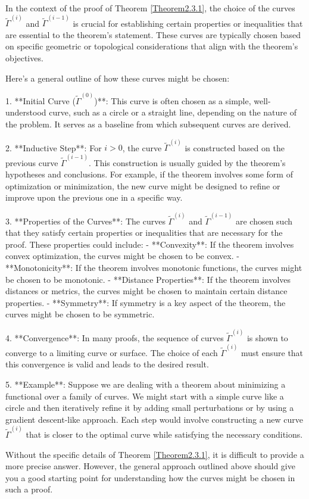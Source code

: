 In the context of the proof of Theorem \ref{Theorem2.3.1}, the choice of the curves \(\tilde{\Gamma}^{(i)}\) and \(\tilde{\Gamma}^{(i-1)}\) is crucial for establishing certain properties or inequalities that are essential to the theorem's statement. These curves are typically chosen based on specific geometric or topological considerations that align with the theorem's objectives.

Here’s a general outline of how these curves might be chosen:

1. **Initial Curve (\(\tilde{\Gamma}^{(0)}\))**: This curve is often chosen as a simple, well-understood curve, such as a circle or a straight line, depending on the nature of the problem. It serves as a baseline from which subsequent curves are derived.

2. **Inductive Step**: For \(i > 0\), the curve \(\tilde{\Gamma}^{(i)}\) is constructed based on the previous curve \(\tilde{\Gamma}^{(i-1)}\). This construction is usually guided by the theorem's hypotheses and conclusions. For example, if the theorem involves some form of optimization or minimization, the new curve might be designed to refine or improve upon the previous one in a specific way.

3. **Properties of the Curves**: The curves \(\tilde{\Gamma}^{(i)}\) and \(\tilde{\Gamma}^{(i-1)}\) are chosen such that they satisfy certain properties or inequalities that are necessary for the proof. These properties could include:
   - **Convexity**: If the theorem involves convex optimization, the curves might be chosen to be convex.
   - **Monotonicity**: If the theorem involves monotonic functions, the curves might be chosen to be monotonic.
   - **Distance Properties**: If the theorem involves distances or metrics, the curves might be chosen to maintain certain distance properties.
   - **Symmetry**: If symmetry is a key aspect of the theorem, the curves might be chosen to be symmetric.

4. **Convergence**: In many proofs, the sequence of curves \(\tilde{\Gamma}^{(i)}\) is shown to converge to a limiting curve or surface. The choice of each \(\tilde{\Gamma}^{(i)}\) must ensure that this convergence is valid and leads to the desired result.

5. **Example**: Suppose we are dealing with a theorem about minimizing a functional over a family of curves. We might start with a simple curve like a circle and then iteratively refine it by adding small perturbations or by using a gradient descent-like approach. Each step would involve constructing a new curve \(\tilde{\Gamma}^{(i)}\) that is closer to the optimal curve while satisfying the necessary conditions.

Without the specific details of Theorem \ref{Theorem2.3.1}, it is difficult to provide a more precise answer. However, the general approach outlined above should give you a good starting point for understanding how the curves might be chosen in such a proof.